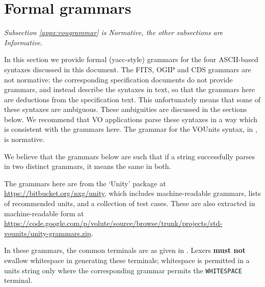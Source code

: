 \documentclass[11pt,notitlepage,onecolumn]{ivoa}
\newcommand*\norm[1]{\textbf{\color{ivoacolor}#1}}
\begin{document}
\clearpage
\section{Formal grammars\label{appx:grammar}}

\emph{Subsection \ref{appx:vougrammar} is Normative, the other
    subsections are Informative.}

In this section we provide formal (yacc-style) grammars for the four
ASCII-based syntaxes discussed in this document.  The FITS, OGIP and
CDS grammars are not normative: the corresponding specification
documents do not provide grammars, and instead describe the syntaxes
in text, so that the grammars here are deductions from the
specification text.
This unfortunately means that some of these syntaxes are ambiguous.
These ambiguities are discussed in the sections below.  We recommend
that VO applications parse these syntaxes in a way which is consistent
with the grammars here.
%
The grammar for the VOUnits syntax, in , is normative.

We believe that the grammars below are such that if a string 
successfully parses in two distinct grammars, it means the same in
both.

The grammars here are from the `Unity' package at
\url{https://bitbucket.org/nxg/unity}, which includes machine-readable
grammars, lists of recommended units, and a collection of test cases.  These are also extracted in
machine-readable form
at \url{https://code.google.com/p/volute/source/browse/trunk/projects/std-vounits/unity-grammars.zip}.

In these grammars, the common terminals are as given in
.  Lexers \norm{must not} swallow whitespace
in generating these terminals; whitespace is permitted in a units
string only where the corresponding grammar permits
the \texttt{WHITESPACE} terminal.
\end{document}
